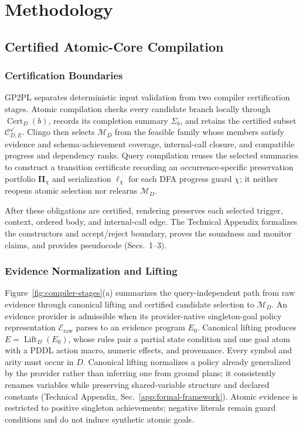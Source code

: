 \section{Methodology}
\label{sec:method}

\subsection{Certified Atomic-Core Compilation}
\label{sec:atomic-core-compilation}

\subsubsection{Certification Boundaries}

GP2PL separates deterministic input validation from two compiler certification
stages. Atomic compilation checks every candidate branch locally through
$\operatorname{Cert}_D(b)$, records its completion summary $\Sigma_b$, and
retains the certified subset $\mathcal C^{\checkmark}_{D,E}$. Clingo then selects
$\mathcal M_D$ from the feasible family whose members satisfy evidence and
schema-achievement coverage, internal-call closure, and compatible progress and
dependency ranks. Query compilation reuses the selected summaries to construct
a transition certificate recording an occurrence-specific preservation
portfolio $\boldsymbol\Pi_\chi$ and serialization $\boldsymbol\ell_\chi$ for each
DFA progress guard $\chi$; it neither reopens atomic selection nor relearns
$\mathcal M_D$.

After these obligations are certified, rendering preserves each selected trigger,
context, ordered body, and internal-call edge. The Technical Appendix
formalizes the constructors and accept/reject boundary, proves the
soundness and monitor claims, and provides pseudocode (Secs.~1--3).

\subsubsection{Evidence Normalization and Lifting}

Figure~\ref{fig:compiler-stages}(a) summarizes the query-independent path from
raw evidence through canonical lifting and certified candidate selection to
$\mathcal M_D$.
An evidence provider is admissible when its provider-native singleton-goal
policy representation $\mathcal E_{\mathrm{raw}}$ parses to an evidence program $E_0$.
Canonical lifting produces
$E=\operatorname{Lift}_D(E_0)$, whose rules pair a partial state condition and
one goal atom with a PDDL action macro, numeric effects, and provenance.
Every symbol and arity must occur in $D$. Canonical lifting normalizes a policy
already generalized by the provider rather than inferring one from ground
plans; it consistently renames variables while preserving shared-variable
structure and declared constants (Technical Appendix,
Sec.~\ref{app:formal-framework}). Atomic evidence is
restricted to positive singleton achievements;
negative literals remain guard conditions and do not induce synthetic atomic
goals.

